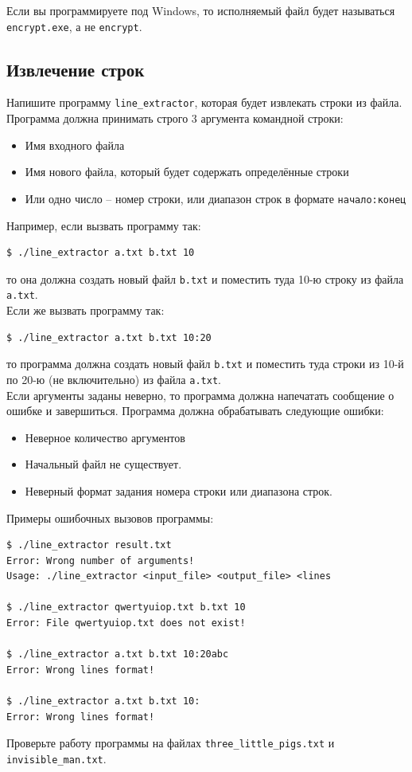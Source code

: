 \documentclass[10pt]{article}
\begin{document}
\noindent Если вы программируете под Windows, то исполняемый файл будет называться \texttt{encrypt.exe}, а не \texttt{encrypt}.


\subsection{Извлечение строк}
Напишите программу \texttt{line\_extractor}, которая будет извлекать строки из файла. Программа должна принимать строго 3 аргумента командной строки:
\begin{itemize}
\item Имя входного файла
\item Имя нового файла, который будет содержать определённые строки
\item Или одно число -- номер строки, или диапазон строк в формате \texttt{начало:конец}
\end{itemize}

\noindent Например, если вызвать программу так:
\begin{lstlisting}
$ ./line_extractor a.txt b.txt 10
\end{lstlisting}
то она должна создать новый файл \texttt{b.txt} и поместить туда 10-ю строку из файла \texttt{a.txt}.\\

\noindent Если же вызвать программу так:
\begin{lstlisting}
$ ./line_extractor a.txt b.txt 10:20
\end{lstlisting}
то программа должна создать новый файл \texttt{b.txt} и поместить туда строки из 10-й по 20-ю (не включительно) из файла \texttt{a.txt}.\\

\noindent Если аргументы заданы неверно, то программа должна напечатать сообщение о ошибке и завершиться. Программа должна обрабатывать следующие ошибки:
\begin{itemize}
\item Неверное количество аргументов
\item Начальный файл не существует.
\item Неверный формат задания номера строки или диапазона строк.
\end{itemize}
Примеры ошибочных вызовов программы:
\begin{lstlisting}
$ ./line_extractor result.txt
Error: Wrong number of arguments!
Usage: ./line_extractor <input_file> <output_file> <lines

$ ./line_extractor qwertyuiop.txt b.txt 10
Error: File qwertyuiop.txt does not exist!

$ ./line_extractor a.txt b.txt 10:20abc
Error: Wrong lines format!

$ ./line_extractor a.txt b.txt 10:
Error: Wrong lines format!
\end{lstlisting}
Проверьте работу программы на файлах \texttt{three\_little\_pigs.txt} и \texttt{invisible\_man.txt}.
\end{document}

